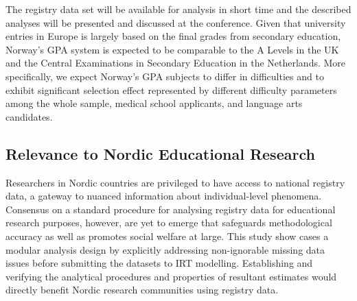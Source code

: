 The registry data set will be available for analysis in short time and the described analyses will be presented and discussed at the conference. Given that university entries in Europe is largely based on the final grades from secondary education, Norway's GPA system is expected to be comparable to the A Levels in the UK and the Central Examinations in Secondary Education in the Netherlands. More specifically, we expect Norway's GPA subjects to differ in difficulties \parencite[per report by][]{he:2018} and to exhibit significant selection effect \parencite[as demonstrated in][]{korobko:2008} represented by different difficulty parameters among the whole sample, medical school applicants, and language arts candidates.

\subsection{Relevance to Nordic Educational Research}

Researchers in Nordic countries are privileged to have access to national registry data, a gateway to nuanced information about individual-level phenomena. Consensus on a standard procedure for analysing registry data for educational research purposes, however, are yet to emerge that safeguards methodological accuracy as well as promotes social welfare at large. This study show cases a modular analysis design by explicitly addressing non-ignorable missing data issues before submitting the datasets to IRT modelling. Establishing and verifying the analytical procedures and properties of resultant estimates would directly benefit Nordic research communities using registry data.

\printbibliography